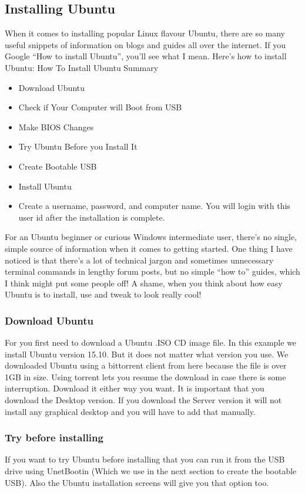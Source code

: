 \subsection{Installing Ubuntu}
When it comes to installing popular Linux flavour Ubuntu, there are so many useful snippets of information on blogs and guides all over the internet. If you Google “How to install Ubuntu”, you’ll see what I mean.
Here’s how to install Ubuntu:
How To Install Ubuntu Summary
\begin{itemize}
	\item Download Ubuntu
	\item Check if Your Computer will Boot from USB
	\item Make BIOS Changes
	\item Try Ubuntu Before you Install It
	\item Create Bootable USB
	\item Install Ubuntu
	\item Create a username, password, and computer name. You will login with this user id after the installation is complete.
\end{itemize}
For an Ubuntu beginner or curious Windows intermediate user, there’s no single, simple source of information when it comes to getting started. One thing I have noticed is that there’s a lot of technical jargon and sometimes unnecessary terminal commands in lengthy forum posts, but no simple “how to” guides, which I think might put some people off! A shame, when you think about how easy Ubuntu is to install, use and tweak to look really cool!
\subsubsection{Download Ubuntu}
For you first need to download a Ubuntu .ISO CD image file. In this example we install Ubuntu version 15.10. But it does not matter what version you use.
We downloaded Ubuntu using a bittorrent client from here because the file is over 1GB in size. Using torrent lets you resume the download in case there is some interruption. Download it either way you want.
It is important that you download the Desktop version. If you download the Server version it will not install any graphical desktop and you will have to add that manually.
\subsubsection{Try before installing}
If you want to try Ubuntu before installing that you can run it from the USB drive using UnetBootin (Which we use in the next section to create the bootable USB). Also the Ubuntu installation screens will give you that option too.
